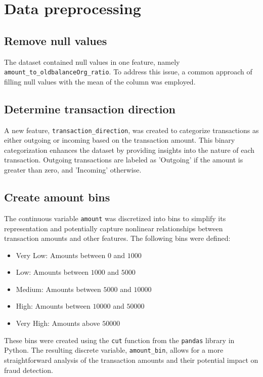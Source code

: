 \section{Data preprocessing}
\subsection{Remove null values}
\hspace{\parindent}
The dataset contained null values in one feature, namely \texttt{amount\_to\_oldbalanceOrg\_ratio}. To address this issue, a common approach of filling null values with the mean of the column was employed.


\subsection{Determine transaction direction}
\hspace{\parindent}
A new feature, \texttt{transaction\_direction}, was created to categorize transactions as either outgoing or incoming based on the transaction amount. This binary categorization enhances the dataset by providing insights into the nature of each transaction. Outgoing transactions are labeled as 'Outgoing' if the amount is greater than zero, and 'Incoming' otherwise.

\subsection{Create amount bins}
\hspace{\parindent}
The continuous variable \texttt{amount} was discretized into bins to simplify its representation and potentially capture nonlinear relationships between transaction amounts and other features. The following bins were defined:

\begin{itemize}
	\item Very Low: Amounts between $0$ and $1000$
	\item Low: Amounts between $1000$ and $5000$
	\item Medium: Amounts between $5000$ and $10000$
	\item High: Amounts between $10000$ and $50000$
	\item Very High: Amounts above $50000$
\end{itemize}

These bins were created using the \texttt{cut} function from the \texttt{pandas} library in Python. The resulting discrete variable, \texttt{amount\_bin}, allows for a more straightforward analysis of the transaction amounts and their potential impact on fraud detection.



